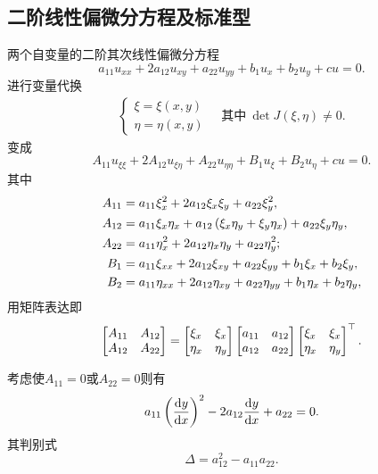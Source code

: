 \subsection{二阶线性偏微分方程及标准型}
两个自变量的二阶其次线性偏微分方程
\[
	a_{11}u_{xx}+2a_{12}u_{xy}+a_{22}u_{yy}+b_1u_x+b_2u_y+cu=0.
\]
进行变量代换
\begin{align*}
	\begin{cases}
		\xi=\xi(x,y) \\
		\eta=\eta(x,y)
	\end{cases}
	\quad\text{其中}~
	\det J(\xi,\eta)\neq 0.
\end{align*}
变成
\[
	A_{11}u_{\xi\xi}+2A_{12}u_{\xi\eta}+A_{22}u_{\eta\eta}+B_1u_\xi+B_2u_\eta+cu=0.
\]
其中
\begin{align*}
	A_{11} & =a_{11}\xi_x^2+2a_{12}\xi_x\xi_y+a_{22}\xi_y^2,                          \\
	A_{12} & =a_{11}\xi_x\eta_x+a_{12}\left(\xi_x\eta_y+\xi_y\eta_x\right)+a_{22}\xi_y\eta_y, \\
	A_{22} & =a_{11}\eta_x^2+2 a_{12}\eta_x\eta_y+a_{22}\eta_y^2;                     \\
	B_1    & =a_{11}\xi_{xx}+2a_{12}\xi_{xy}+a_{22}\xi_{yy}+b_1\xi_x+b_2\xi_y,        \\
	B_2    & =a_{11}\eta_{xx}+2a_{12}\eta_{xy}+a_{22}\eta_{yy}+b_1\eta_x+b_2\eta_y,
\end{align*}
用矩阵表达即
\begin{align*}
	\begin{bmatrix}
		A_{11} & A_{12} \\
		A_{12} & A_{22}
	\end{bmatrix}=\begin{bmatrix}
		\xi_x  & \xi_x  \\
		\eta_x & \eta_y
	\end{bmatrix}\begin{bmatrix}
		a_{11} & a_{12} \\
		a_{12} & a_{22}
	\end{bmatrix}\begin{bmatrix}
		\xi_x  & \xi_x  \\
		\eta_x & \eta_y
	\end{bmatrix}^\top.
\end{align*}

考虑使$A_{11}=0$或$A_{22}=0$则有
\[
	a_{11}\kh{\dv yx}^2-2a_{12}\dv yx+a_{22}=0.
\]
其判别式
\[
	\Delta=a_{12}^2-a_{11}a_{22}.
\]
